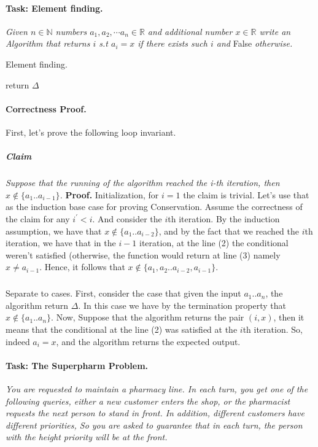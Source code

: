 \paragraph{Task: Element finding.}  \textit{Given $n\in \mathbb{N}$ numbers $a_1, a_2, \cdots a_n \in \mathbb{R}$ and additional number $x \in \mathbb{R}$ write an Algorithm that returns $i$ s.t $a_{i} = x$ if there exists such $i$ and} False \textit{otherwise.} 

\begin{algbox}{Element finding.}
\begin{algorithm}[H]
  { 
    } 
    return \( \Delta \) 
\end{algorithm}
\end{algbox}
\paragraph{Correctness Proof.} First, let's prove the following loop invariant. 
\subparagraph{Claim} \textit{Suppose that the running of the algorithm reached the i-th iteration, then $x \notin \{ a_{1} .. a_{i-1} \}$.} 
\textbf{Proof.} Initialization, for $i=1$ the claim is trivial. Let's use that as the induction base case for proving Conservation. Assume the correctness of the claim for any $i^{\prime} < i$. And consider the $i$th iteration. By the induction assumption, we have that $x \notin \{a_1 .. a_{i-2} \} $, and by the fact that we reached the $i$th iteration, we have that in the $i-1$ iteration, at the line (2) the conditional weren't satisfied (otherwise, the function would return at line (3) namely $x \neq a_{i-1}$. Hence, it follows that $ x \notin \{ a_1, a_2 .. a_{i-2}, a_{i-1} \} $.     
  \subparagraph{} Separate to cases. First, consider the case that given the input $a_1 .. a_n$, the algorithm return $\Delta$. In this case we have by the termination property that $x \notin \{ a_1 .. a_n \} $. Now, Suppose that the algorithm returns the pair $\left( i, x \right)$, then it means that the conditional at the line (2) was satisfied at the $i$th iteration. So, indeed $a_{i} = x$, and the algorithm returns the expected output.        



\paragraph{Task: The Superpharm Problem.}\textit{You are requested to maintain a pharmacy line. In each turn, you get one of the following queries, either a new customer enters the shop, or the pharmacist requests the next person to stand in front. In addition, different customers have different priorities, So you are asked to guarantee that in each turn, the person with the height priority will be at the front.}

